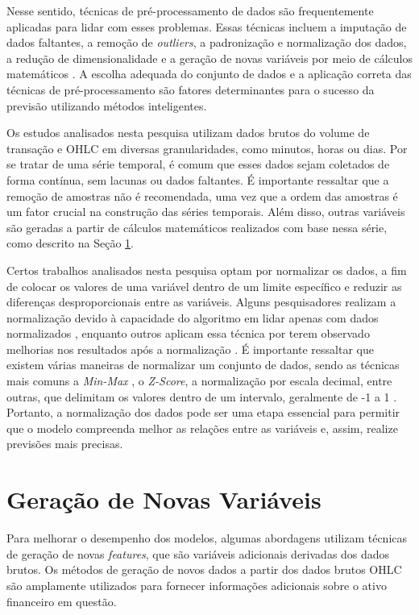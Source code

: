 Nesse sentido, técnicas de pré-processamento de dados são frequentemente aplicadas para lidar com esses problemas. Essas técnicas incluem a imputação de dados faltantes, a remoção de \textit{outliers}, a padronização e normalização dos dados, a redução de dimensionalidade e a geração de novas variáveis por meio de cálculos matemáticos \cite{tomasevic2020overview}. A escolha adequada do conjunto de dados e a aplicação correta das técnicas de pré-processamento são fatores determinantes para o sucesso da previsão utilizando métodos inteligentes.

Os estudos analisados nesta pesquisa utilizam dados brutos do volume de transação e \ac{OHLC} em diversas granularidades, como minutos, horas ou dias. Por se tratar de uma série temporal, é comum que esses dados sejam coletados de forma contínua, sem lacunas ou dados faltantes. É importante ressaltar que a remoção de amostras não é recomendada, uma vez que a ordem das amostras é um fator crucial na construção das séries temporais. Além disso, outras variáveis são geradas a partir de cálculos matemáticos realizados com base nessa série, como descrito na Seção \ref{subsec:geracao_novas_variaveis}.

Certos trabalhos analisados nesta pesquisa optam por normalizar os dados, a fim de colocar os valores de uma variável dentro de um limite específico e reduzir as diferenças desproporcionais entre as variáveis. Alguns pesquisadores realizam a normalização devido à capacidade do algoritmo em lidar apenas com dados normalizados \cite{Manrui_two-stage}, enquanto outros aplicam essa técnica por terem observado melhorias nos resultados após a normalização \cite{Anand_Comparison, Chaojie_Stock}. É importante ressaltar que existem várias maneiras de normalizar um conjunto de dados, sendo as técnicas mais comuns a \textit{Min-Max} \cite{Leonardo_Comparative, Gourav_Swarm}, o \textit{Z-Score}, a normalização por escala decimal, entre outras, que delimitam os valores dentro de um intervalo, geralmente de -1 a 1 \cite{Jerzy_Deep}. Portanto, a normalização dos dados pode ser uma etapa essencial para permitir que o modelo compreenda melhor as relações entre as variáveis e, assim, realize previsões mais precisas.



\section{Geração de Novas Variáveis}
\label{subsec:geracao_novas_variaveis}
Para melhorar o desempenho dos modelos, algumas abordagens utilizam técnicas de geração de novas \textit{features}, que são variáveis adicionais derivadas dos dados brutos. Os métodos de geração de novos dados a partir dos dados brutos \ac{OHLC} são amplamente utilizados para fornecer informações adicionais sobre o ativo financeiro em questão.

